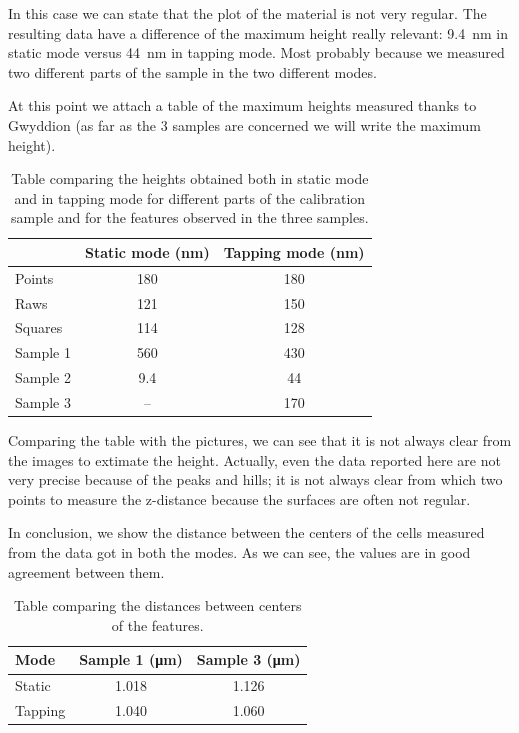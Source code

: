 \documentclass[11pt,a4paper]{article}
\begin{document}
In this case we can state that the plot of the material is not very regular. The resulting data have a difference of the maximum height really relevant: \SI{9.4}{\nano\m} in static mode versus \SI{44}{\nano\m} in tapping mode. Most probably because we measured two different parts of the sample in the two different modes.

At this point we attach a table of the maximum heights measured thanks to Gwyddion (as far as the 3 samples are concerned we will write the maximum height).

\begin{table}[H]
\centering
\begin{tabular}{l c c}
\toprule
& Static mode (\si{\nano\m}) & Tapping mode (\si{\nano\m})\\
\midrule
Points   & 180 & 180 \\
Raws     & 121 & 150 \\
Squares  & 114 & 128 \\
Sample 1 & 560 & 430 \\
Sample 2 & 9.4 & 44 \\
Sample 3 & -- & 170 \\
\bottomrule
\end{tabular}
\caption{Table comparing the heights obtained both in static mode and in tapping mode for different parts of the calibration sample and for the features observed in the three samples.}
\label{table:comparison}
\end{table}

Comparing the table with the pictures, we can see that it is not always clear from the images to extimate the height. Actually, even the data reported here are not very precise because of the peaks and hills; it is not always clear from which two points to measure the z-distance because the surfaces are often not regular.

In conclusion, we show the distance between the centers of the cells measured from the data got in both the modes. As we can see, the values are in good agreement between them.

\begin{table}[H]
\centering
\begin{tabular}{l c c}
\toprule
Mode & Sample 1 (\si{\micro\m}) & Sample 3 (\si{\micro\m}) \\
\midrule
Static & 1.018 & 1.126 \\
Tapping & 1.040 & 1.060 \\
\bottomrule
\end{tabular}
\caption{Table comparing the distances between centers of the features.}
\label{table:comparison2}
\end{table}
\end{document}
